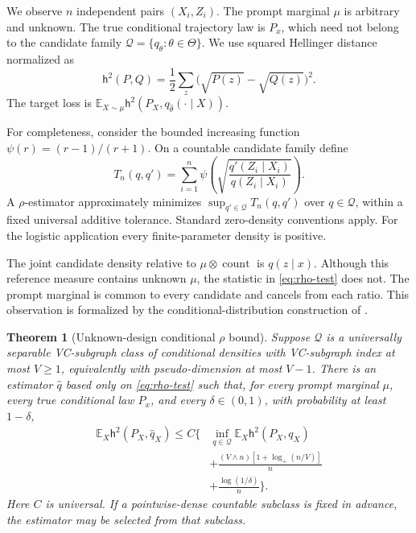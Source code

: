 \documentclass[twoside]{article}
\newtheorem{theorem}{Theorem}
\newcommand{\E}{\mathbb E}
\newcommand{\Q}{\mathcal Q}
\newcommand{\h}{\mathsf h}
\begin{document}
We observe $n$ independent pairs $(X_i,Z_i)$. The prompt marginal $\mu$ is arbitrary and unknown. The true conditional trajectory law is $P_x$, which need not belong to the candidate family $\Q=\{q_\theta:\theta\in\Theta\}$. We use squared Hellinger distance normalized as
\[
 \h^2(P,Q)=\frac12\sum_z\bigl(\sqrt{P(z)}-\sqrt{Q(z)}\bigr)^2.
\]
The target loss is $\E_{X\sim\mu}\h^2(P_X,q_{\widehat\theta}(\cdot\mid X))$.

For completeness, consider the bounded increasing function $\psi(r)=(r-1)/(r+1)$. On a countable candidate family define
\begin{equation}
 T_n(q,q')=\sum_{i=1}^n\psi\!\left(\sqrt{\frac{q'(Z_i\mid X_i)}{q(Z_i\mid X_i)}}\right).
 \label{eq:rho-test}
\end{equation}
A $\rho$-estimator approximately minimizes $\sup_{q'\in\Q}T_n(q,q')$ over $q\in\Q$, within a fixed universal additive tolerance. Standard zero-density conventions apply. For the logistic application every finite-parameter density is positive.

The joint candidate density relative to $\mu\otimes\operatorname{count}$ is $q(z\mid x)$. Although this reference measure contains unknown $\mu$, the statistic in \eqref{eq:rho-test} does not. The prompt marginal is common to every candidate and cancels from each ratio. This observation is formalized by the conditional-distribution construction of \citet[Section 8]{baraud2018}.

\begin{theorem}[Unknown-design conditional $\rho$ bound]
\label{thm:rho}
Suppose $\Q$ is a universally separable VC-subgraph class of conditional densities with VC-subgraph index at most $V\geq1$, equivalently with pseudo-dimension at most $V-1$. There is an estimator $\widehat q$ based only on \eqref{eq:rho-test} such that, for every prompt marginal $\mu$, every true conditional law $P_x$, and every $\delta\in(0,1)$, with probability at least $1-\delta$,
\begin{align}
 \E_X\h^2(P_X,\widehat q_X)
 \leq C\bigg\{&\inf_{q\in\Q}\E_X\h^2(P_X,q_X)\nonumber\\
 &+\frac{(V\wedge n)[1+\log_+(n/V)]}{n}\nonumber\\
 &+\frac{\log(1/\delta)}{n}\bigg\}.
 \label{eq:rho-oracle}
\end{align}
Here $C$ is universal. If a pointwise-dense countable subclass is fixed in advance, the estimator may be selected from that subclass.
\end{theorem}
\end{document}
